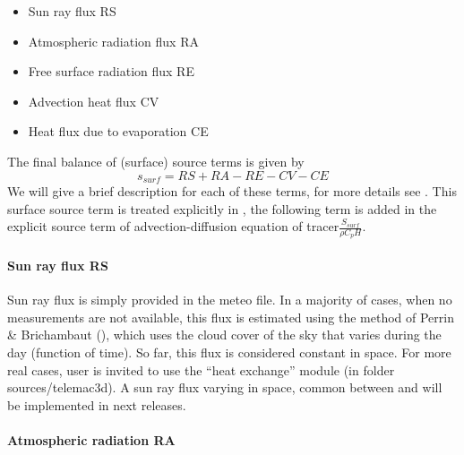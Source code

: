 \begin{itemize}
\item  Sun ray flux RS

\item  Atmospheric radiation flux RA

\item  Free surface radiation flux RE

\item  Advection heat flux CV

\item  Heat flux due to evaporation CE
\end{itemize}

 The final balance of (surface) source terms is given by
\[s_{surf}=RS+RA-RE-CV-CE\]
We will give a brief description for each of these terms, for more details see \cite{El-Kadi2012}. This surface source term is treated explicitly in , the following term is added in the explicit source term of advection-diffusion equation of tracer$\frac{S_{surf}}{\rho C_pH}$.


\paragraph{ Sun ray flux RS}

 Sun ray flux is simply provided in the meteo file. In a majority of cases, when no measurements are not available, this flux is estimated using the method of Perrin \& Brichambaut (\cite{El-Kadi2012}), which uses the cloud cover of the sky that varies during the day (function of time). So far, this flux is considered constant in space.  For more real cases, user is invited to use the ``heat exchange'' module (in folder sources/telemac3d). A sun ray flux varying in space, common between  and  will be implemented in next releases.


\paragraph{ Atmospheric radiation RA}

